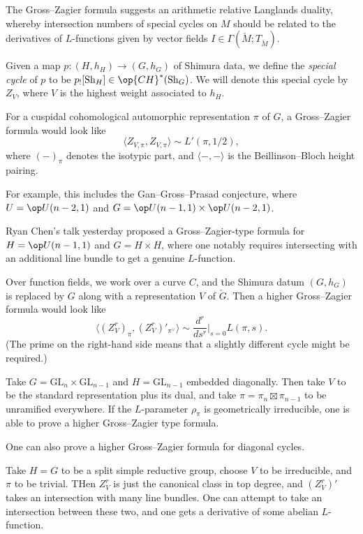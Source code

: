 \documentclass{article}
\begin{document}
The Gross--Zagier formula suggests an arithmetic relative Langlands duality, whereby intersection numbers of special cycles on $M$ should be related to the derivatives of $L$-functions given by vector fields $I\in\Gamma(\check M;T_{\check M})$.
\begin{definition}
	Given a map $p\colon(H,h_H)\to(G,h_G)$ of Shimura data, we define the \textit{special cycle} of $p$ to be $p_![\mathrm{Sh}_H]\in\op{CH}^*(\mathrm{Sh}_G)$. We will denote this special cycle by $Z_V$, where $V$ is the highest weight associated to $h_H$.
\end{definition}
For a cuspidal cohomological automorphic representation $\pi$ of $G$, a Gross--Zagier formula would look like
\[\langle Z_{V,\pi},Z_{V,\pi}\rangle\sim L'(\pi,1/2),\]
where $(-)_\pi$ denotes the isotypic part, and $\langle-,-\rangle$ is the Beillinson--Bloch height pairing.
\begin{example}
	For example, this includes the Gan--Gross--Prasad conjecture, where $U=\op U(n-2,1)$ and $G=\op U(n-1,1)\times\op U(n-2,1)$.
\end{example}
\begin{example}
	Ryan Chen's talk yesterday proposed a Gross--Zagier-type formula for $H=\op U(n-1,1)$ and $G=H\times H$, where one notably requires intersecting with an additional line bundle to get a genuine $L$-function.
\end{example}
Over function fields, we work over a curve $C$, and the Shimura datum $(G,h_G)$ is replaced by $G$ along with a representation $V$ of $\check G$. Then a higher Gross--Zagier formula would look like
\[\langle (Z^r_V)_\pi,(Z^r_V)'_{\pi^\lor}\rangle\sim\frac{d^r}{ds^r}\bigg|_{s=0}L(\pi,s).\]
(The prime on the right-hand side means that a slightly different cycle might be required.)
\begin{example}
	Take $G=\mathrm{GL}_n\times\mathrm{GL}_{n-1}$ and $H=\mathrm{GL}_{n-1}$ embedded diagonally. Then take $V$ to be the standard representation plus its dual, and take $\pi=\pi_n\boxtimes\pi_{n-1}$ to be unramified everywhere. If the $L$-parameter $\rho_\pi$ is geometrically irreducible, one is able to prove a higher Gross--Zagier type formula.
\end{example}
One can also prove a higher Gross--Zagier formula for diagonal cycles.
\begin{example}
	Take $H=G$ to be a split simple reductive group, choose $V$ to be irreducible, and $\pi$ to be trivial. THen $Z^r_V$ is just the canonical class in top degree, and $(Z^r_V)'$ takes an intersection with many line bundles. One can attempt to take an intersection between these two, and one gets a derivative of some abelian $L$-function.
\end{example}
\end{document}
